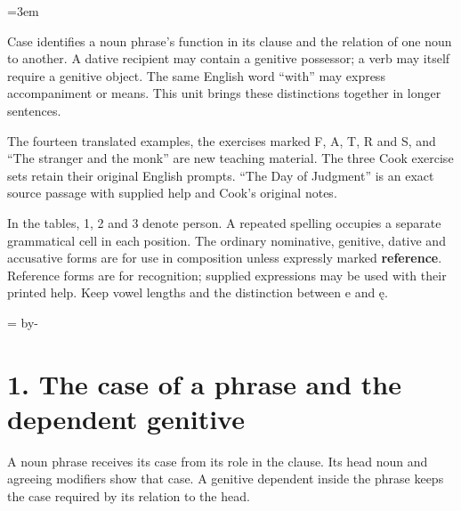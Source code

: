 \BookRecto
\begingroup
\renewcommand{\runningtitle}{Unit 10. The case system}
\emergencystretch=3em
\newcommand{\itempara}[2]{\par\addvspace{3pt}\noindent\hangindent=1.8em\hangafter=1\makebox[1.8em][l]{#1.}#2\par}
\newcommand{\reserve}[1]{\par\penalty-100\begingroup\dimen0=\pagegoal\advance\dimen0 by-\pagetotal\ifdim\dimen0<#1\newpage\fi\endgroup}

\raggedright
{}

Case identifies a noun phrase's function in its clause and the relation of one noun to another. A dative recipient may contain a genitive possessor; a verb may itself require a genitive object. The same English word “with” may express accompaniment or means. This unit brings these distinctions together in longer sentences.

The fourteen translated examples, the exercises marked F, A, T, R and S, and “The stranger and the monk” are new teaching material. The three Cook exercise sets retain their original English prompts. “The Day of Judgment” is an exact source passage with supplied help and Cook's original notes.

In the tables, 1, 2 and 3 denote person. A repeated spelling occupies a separate grammatical cell in each position. The ordinary nominative, genitive, dative and accusative forms are for use in composition unless expressly marked \textbf{reference}. Reference forms are for recognition; supplied expressions may be used with their printed help. Keep vowel lengths and the distinction between e and ę.

\reserve{7\baselineskip}
\section*{1. The case of a phrase and the dependent genitive}

A noun phrase receives its case from its role in the clause. Its head noun and agreeing modifiers show that case. A genitive dependent inside the phrase keeps the case required by its relation to the head.

